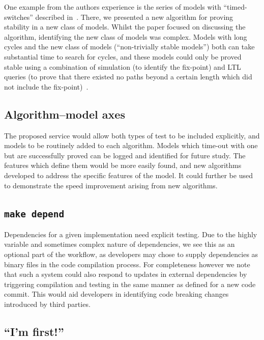 \documentclass[conference]{IEEEtran}
\begin{document}
One example from the authors experience is the series of models with
``timed-switches'' described in~\cite{cook-et-al:2014}. There, we
presented a new algorithm for proving stability in a new class of
models. Whilst the paper focused on discussing the algorithm,
identifying the new class of models was complex. Models with long
cycles and the new class of models (``non-trivially stable models'')
both can take substantial time to search for cycles, and these models
could only be proved stable using a combination of simulation (to
identify the fix-point) and LTL queries (to prove that there existed
no paths beyond a certain length which did not include the
fix-point)~\cite{claessen-et-al:2013}.

\subsection{Algorithm--model axes}

The proposed service would allow both types of test to be included
explicitly, and models to be routinely added to each algorithm. Models
which time-out with one but are successfully proved can be logged and
identified for future study.  The features which define them would be
more easily found, and new algorithms developed to address the
specific features of the model. It could further be used to
demonstrate the speed improvement arising from new algorithms.

\subsection{{\texttt{make depend}}}

Dependencies for a given implementation need explicit testing. Due to
the highly variable and sometimes complex nature of dependencies, we
see this as an optional part of the workflow, as developers may chose
to supply dependencies as binary files in the code compilation
process. For completeness however we note that such a system could
also respond to updates in external dependencies by triggering
compilation and testing in the same manner as defined for a new code
commit. This would aid developers in identifying code breaking changes
introduced by third parties.

\subsection{``I'm first!''}
\end{document}
